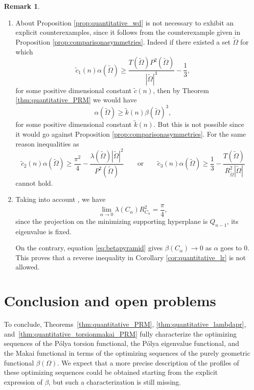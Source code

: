 \documentclass[oneside,a4paper,11pt,notitlepage]{article}
\theoremstyle{definition}
\theoremstyle{plain}
\theoremstyle{definition}
\newtheorem{oss}[esempio]{Remark}
\begin{document}
\begin{oss}
\begin{enumerate}
 \item About Proposition \ref{prop:quantitative_wd} is not necessary to exhibit an explicit counterexamples, since it follows from the counterexample given in Proposition \ref{prop:comparisonasymmetries}. Indeed if there existed a set $\tilde{\Omega}$ for which 
 \begin{equation*}
     \tilde{c}_1(n)\alpha(\tilde{\Omega})\ge \frac{T(\tilde\Omega)P^2(\tilde\Omega)}{|\tilde\Omega|^3}-\frac{1}{3}, 
 \end{equation*}
  for some positive dimensional constant $\tilde c(n)$, then by Theorem  \ref{thm:quantitative_PRM} we would have
  \begin{equation*}
       \alpha(\tilde\Omega)\ge \tilde k(n)\beta(\tilde\Omega)^3,
  \end{equation*}
  for some positive dimensional constant $\tilde k(n)$. But this is not possible since it would go against Proposition \ref{prop:comparisonasymmetries}. For the same reason inequalities as
  \begin{equation*}
      \tilde c_2(n)\alpha(\tilde \Omega) \ge \frac{\pi^2}{4}-\frac{\lambda(\tilde\Omega)|\tilde\Omega|^2}{P^2(\tilde\Omega)}\qquad \text{or}\qquad \tilde c_3(n)\alpha(\tilde \Omega) \ge\frac{1}{3}-\frac{T(\tilde\Omega)}{R^2_{\tilde\Omega}|\tilde\Omega|}
  \end{equation*}
cannot hold.
 \item Taking into account \cite{BFNT2020}, we have
 $$\lim_{\alpha \to 0}\lambda(C_\alpha) R^2_{C_\alpha} =\frac \pi 4,$$
 since the projection on the minimizing supporting hyperplane is $Q_{n-1}$, its eigenvalue is fixed.

On the contrary, equation \eqref{eq:betapyramid} gives $\beta(C_\alpha) \to 0$ as $\alpha$ goes to 0.
This proves that a reverse inequality in Corollary \ref{cor:quantitative_lr} is not allowed.


\end{enumerate}

\end{oss}


\section{Conclusion and open problems}

To conclude, Theorems~\ref{thm:quantitative_PRM}, \ref{thm:quantitative_lambdapr}, and~\ref{thm:quantitative_torsionmakai_PRM} fully characterize the optimizing sequences of the P\'olya torsion functional, the P\'olya eigenvalue functional, and the Makai functional in terms of the optimizing sequences of the purely geometric functional $\beta(\Omega)$. 
We expect that a more precise description of the profiles of these optimizing sequences could be obtained starting from the explicit expression of $\beta$, but such a characterization is still missing.
\end{document}
